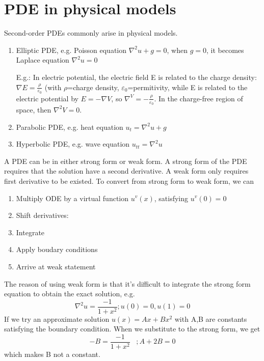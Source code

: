\section{PDE in physical models}

Second-order PDEs commonly arise in physical models.
\begin{enumerate}
  \item Elliptic PDE, e.g. Poisson equation $\nabla^2 u + g = 0$, when $g=0$, it
  becomes Laplace equation $\nabla^2u=0$
  
  E.g.: In electric potential, the electric field E is related to the charge
  density: $\nabla E = \frac{\rho}{\varepsilon_0}$ (with $\rho$=charge density,
  $\varepsilon_0$=permitivity, while E is related to the electric potential by
  $E=-\nabla V$, so $\nabla^ V=-\frac{\rho}{\varepsilon_0}$. In the charge-free
  region of space, then $\nabla^2 V = 0$.
  
  \item Parabolic PDE, e.g. heat equation $u_t = \nabla^2 u + g$
  \item Hyperbolic PDE, e.g. wave equation $u_{tt}=\nabla^2u$
\end{enumerate}

A PDE can be in either strong form or weak form. A strong form of the PDE
requires that the solution have a second derivative. A weak form only requires
first derivative to be existed. To convert from strong form to weak form, we can
\begin{enumerate}
  \item Multiply ODE by a virtual function $u^v(x)$, satisfying $u^v(0)=0$
  \item Shift derivatives: 
  \item Integrate
  \item Apply boudary conditions
  \item Arrive at weak statement
\end{enumerate}
The reason of using weak form is that it's difficult to integrate the strong
form equation to obtain the exact solution, e.g.
\begin{equation}
\nabla^2 u = \frac{-1}{1+x^2}; u(0)=0, u(1)=0
\end{equation}
If we try an approximate solution $u(x)=Ax+Bx^2$ with A,B are constants
satisfying the boundary condition. When we substitute to the strong form, we get
\begin{equation}
-B=\frac{-1}{1+x^2} \;\;\;; A+2B=0
\end{equation}
which makes B not a constant.

